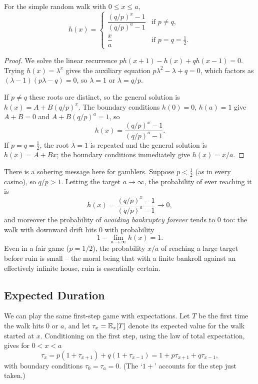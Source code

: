 \documentclass[a4paper]{scrartcl}
\begin{document}
\begin{theorem}
	For the simple random walk with $0 \leq x \leq a$,
	$$
	h(x) = \begin{cases}
		\dfrac{(q/p)^x - 1}{(q/p)^a - 1} & \text{if } p \neq q, \\[2ex]
		\dfrac{x}{a} & \text{if } p = q = \frac12.
	\end{cases}
	$$
\end{theorem}
\begin{proof}
	We solve the linear recurrence $p h(x+1) - h(x) + q h(x - 1) = 0$. Trying $h(x) = \lambda^x$ gives the auxiliary equation $p\lambda^2 - \lambda + q = 0$, which factors as $(\lambda - 1)(p\lambda - q) = 0$, so $\lambda = 1$ or $\lambda = q/p$.

	If $p \neq q$ these roots are distinct, so the general solution is $h(x) = A + B(q/p)^x$. The boundary conditions $h(0) = 0$, $h(a) = 1$ give $A + B = 0$ and $A + B(q/p)^a = 1$, so
	$$
	h(x) = \frac{(q/p)^x - 1}{(q/p)^a - 1}.
	$$
	If $p = q = \frac{1}{2}$, the root $\lambda = 1$ is repeated and the general solution is $h(x) = A + Bx$; the boundary conditions immediately give $h(x) = x/a$.
\end{proof}

There is a sobering message here for gamblers. Suppose $p < \frac12$ (as in every casino), so $q/p > 1$. Letting the target $a \rightarrow \infty$, the probability of ever reaching it is
$$
h(x) = \frac{(q/p)^x - 1}{(q/p)^a - 1} \longrightarrow 0,
$$
and moreover the probability of \emph{avoiding bankruptcy forever} tends to $0$ too: the walk with downward drift hits $0$ with probability
$$
1 - \lim_{a \to \infty}h(x) = 1.
$$
Even in a fair game ($p = 1/2$), the probability $x/a$ of reaching a large target before ruin is small -- the moral being that with a finite bankroll against an effectively infinite house, ruin is essentially certain.

\subsection{Expected Duration}

We can play the same first-step game with expectations. Let $T$ be the first time the walk hits $0$ or $a$, and let $\tau_x = \mathbb{E}_x[T]$ denote its expected value for the walk started at $x$. Conditioning on the first step, using the law of total expectation, gives for $0 < x < a$
$$
\tau_x = p(1 + \tau_{x + 1}) + q(1 + \tau_{x - 1}) = 1 + p\tau_{x+1} + q\tau_{x - 1},
$$
with boundary conditions $\tau_0 = \tau_a = 0$. (The `$1 +$' accounts for the step just taken.)
\end{document}
